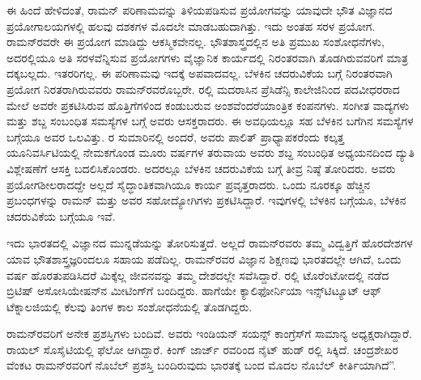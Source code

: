 ಈ ಹಿಂದೆ ಹೇಳಿದಂತೆ, ರಾಮನ್ ಪರಿಣಾಮವನ್ನು ತಿಳಿಯಪಡಿಸುವ ಪ್ರಯೋಗವನ್ನು ಯಾವುದೇ ಭೌತ ವಿಜ್ಞಾನದ ಪ್ರಯೋಗಾಲಯಗಳಲ್ಲಿ ಹಲವು ದಶಕಗಳ ಮೊದಲೇ ಮಾಡಬಹುದಾಗಿತ್ತು. ಇದು ಅಂತಹ ಸರಳ ಪ್ರಯೋಗ. ರಾಮನ್‍ರವರೇ ಈ ಪ್ರಯೋಗ ಮಾಡಿದ್ದು ಆಕಸ್ಮಿಕವೇನಲ್ಲ. ಭೌತಶಾಸ್ತ್ರದಲ್ಲಿನ ಅತಿ ಪ್ರಮುಖ ಸಂಶೋಧನೆಗಳು, ಅದರಲ್ಲಿಯೂ ಅತಿ ಸರಳವೆನ್ನಿಸುವ ಪ್ರಯೋಗಗಳು ವೈಜ್ಞಾನಿಕ ಕಾರ್ಯದಲ್ಲಿ ನಿರಂತರವಾಗಿ ತೊಡಗಿರುವವರಿಗೆ ಮಾತ್ರ ದಕ್ಕಬಲ್ಲದು. ಇತರರಿಗಲ್ಲ. ಈ ಪರಿಣಾಮವು ಇದಕ್ಕೆ ಅಪವಾದವಲ್ಲ. ಬೆಳಕಿನ ಚದರುವಿಕೆಯ ಬಗ್ಗೆ ನಿರಂತರವಾಗಿ ಪ್ರಯೋಗ ನಿರತರಾಗಿರುವವರು ರಾಮನ್‍ರವರೊಬ್ಬರೇ. ರಲ್ಲಿ ಮದರಾಸಿನ ಪ್ರೆಸಿಡೆನ್ಸಿ ಕಾಲೇಜಿನಿಂದ ಪದವೀಧರರಾದ ಮೇಲೆ ಅವರೇ ಪ್ರಕಟಿಸಿರುವ ಹೊತ್ತಿಗೆಗಳಿಂದ\enginline{-} ಕಂಡುಬರುವ ಅಂಶವೆಂದರೆ\enginline{-}ಯಾಂತ್ರಿಕ ಕಂಪನಗಳು. ಸಂಗೀತ ವಾದ್ಯಗಳು ಮತ್ತು ಶಬ್ದ ಸಂಬಂಧಿತ ಸಮಸ್ಯೆಗಳ ಬಗ್ಗೆ ಅವರು ಆಸಕ್ತರಾದರು. ಈ ಅವಧಿಯಲ್ಲೂ ಸಹ ಬೆಳಕಿನ ಬಗೆಗಿನ ಸಮಸ್ಯೆಗಳ ಬಗ್ಗೆಯೂ ಅವರ ಒಲವಿತ್ತು. ರ ಸುಮಾರಿನಲ್ಲಿ ಅಂದರೆ, ಅವರು ಪಾಲಿತ್ ಪ್ರಾಧ್ಯಾಪಕರೆಂದು ಕಲ್ಕತ್ತ ಯೂನಿವರ್ಸಿಟಿಯಲ್ಲಿ ನೇಮಕಗೊಂಡ ಮೂರು ವರ್ಷಗಳ ತರುವಾಯ ಅವರು ಶಬ್ದ ಸಂಬಂಧಿತ ಅಧ್ಯಯನದಿಂದ ದ್ಯುತಿ ವಿಶ್ಲೇಷಣೆಗೆ ಆಸಕ್ತಿ ಬದಲಿಸಿಕೊಂಡರು. ಅದರಲ್ಲೂ ಬೆಳಕಿನ ಚದರುವಿಕೆಯ ಬಗ್ಗೆ ತೀವ್ರ ನಿಷ್ಠೆ ತೋರಿದರು. ಅವರು ಪ್ರಯೋಗಶೀಲರಾದದ್ದೇ ಅಲ್ಲದೆ ಸೈದ್ಧಾಂತಿಕವಾಗಿಯೂ ಕಾರ್ಯ ಪ್ರವೃತ್ತರಾದರು. ಒಂದು ನೂರಕ್ಕೂ ಹೆಚ್ಚಿನ ಪ್ರಬಂಧಗಳನ್ನು ರಾಮನ್ ಮತ್ತು ಅವರ ಸಹೋದ್ಯೋಗಿಗಳು ಪ್ರಕಟಿಸಿದ್ದಾರೆ. ಇವುಗಳಲ್ಲಿ  ಬೆಳಕಿನ ಬಗ್ಗೆಯೂ,  ಬೆಳಕಿನ ಚದರುವಿಕೆಯ ಬಗ್ಗೆಯೂ ಇವೆ.

ಇದು ಭಾರತದಲ್ಲಿ ವಿಜ್ಞಾನದ ಮುನ್ನಡೆಯನ್ನು ತೋರಿಸುತ್ತದೆ. ಅಲ್ಲದೆ ರಾಮನ್‍ರವರು ತಮ್ಮ ವಿದ್ವತ್ತಿಗೆ ಹೊರದೇಶಗಳ ಯಾವ ಭೌತಶಾಸ್ತ್ರಜ್ಞರಿಂದಲೂ ಸಹಾಯ ಪಡೆದಿಲ್ಲ. ರಾಮನ್‍ರವರ ವಿಜ್ಞಾನ ಶಿಕ್ಷಣವು ಭಾರತದಲ್ಲೇ ಆಗಿದೆ, ಒಂದು ವರ್ಷ ಹೊರತುಪಡಿಸಿದರೆ ಮಿಕ್ಕೆಲ್ಲ ಜೀವನವನ್ನು ತಮ್ಮ ದೇಶದಲ್ಲೇ ಸವೆಸಿದ್ದಾರೆ. ರಲ್ಲಿ ಟೊರೆಂಟೋದಲ್ಲಿ ನಡೆದ ಬ್ರಿಟಿಷ್ ಅಸೋಸಿಯೇಷನ್‍ನ ಮೀಟಿಂಗ್‍ಗೆ ಬಂದಿದ್ದರು. ಹಾಗೆಯೇ ಕ್ಯಾಲಿಫೋರ್ನಿಯಾ ಇನ್ಸ್‌ಟಿಟ್ಯೂಟ್ ಆಫ್ ಟೆಕ್ನಾಲಜಿಯಲ್ಲಿ ಕೆಲವು ತಿಂಗಳ ಕಾಲ ಸಂಶೋಧನೆಯಲ್ಲಿ ತೊಡಗಿದ್ದರು.

ರಾಮನ್‍ರವರಿಗೆ ಅನೇಕ ಪ್ರಶಸ್ತಿಗಳು ಬಂದಿವೆ. ಅವರು ಇಂಡಿಯನ್ ಸಯನ್ಸ್ ಕಾಂಗ್ರೆಸ್‍ಗೆ ಸಾಮಾನ್ಯ ಅಧ್ಯಕ್ಷರಾಗಿದ್ದಾರೆ. ರಾಯಲ್ ಸೊಸೈಟಿಯಲ್ಲಿ ಫೆಲೋ ಆಗಿದ್ದಾರೆ. ಕಿಂಗ್ ಜಾರ್ಜ್ ರವರಿಂದ ನೈಟ್ ಹುಡ್ ರಲ್ಲಿ ಸಿಕ್ಕಿದೆ. ಚಂದ್ರಶೇಖರ ವೆಂಕಟ ರಾಮನ್‍ರವರಿಗೆ ನೊಬೆಲ್ ಪ್ರಶಸ್ತಿ ಬಂದಿರುವುದು ಭಾರತಕ್ಕೆ ಬಂದ ಮೊದಲ ನೊಬೆಲ್ ಕೀರ್ತಿಯಾಗಿದೆ”.

